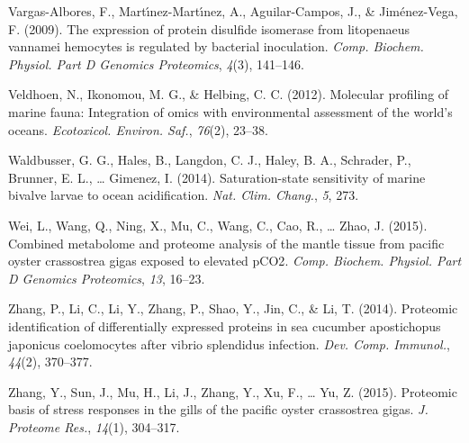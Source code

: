 \documentclass [11pt, proquest] {uwthesis}[2015/03/03]
\newlength{\cslhangindent}
\newenvironment{CSLReferences}%
{\setlength{\parindent}{0pt}%
\everypar{\setlength{\hangindent}{\cslhangindent}}\ignorespaces}%
{\par}
\begin{document}
\begin{CSLReferences}{1}{0}
\leavevmode\hypertarget{ref-Vargas-Albores2009}{}%
Vargas-Albores, F., Martı́nez-Martı́nez, A., Aguilar-Campos, J., \& Jiménez-Vega, F. (2009). The expression of protein disulfide isomerase from litopenaeus vannamei hemocytes is regulated by bacterial inoculation. \emph{Comp. Biochem. Physiol. Part D Genomics Proteomics}, \emph{4}(3), 141--146.

\leavevmode\hypertarget{ref-Veldhoen2012}{}%
Veldhoen, N., Ikonomou, M. G., \& Helbing, C. C. (2012). Molecular profiling of marine fauna: Integration of omics with environmental assessment of the world's oceans. \emph{Ecotoxicol. Environ. Saf.}, \emph{76}(2), 23--38.

\leavevmode\hypertarget{ref-Waldbusser2014}{}%
Waldbusser, G. G., Hales, B., Langdon, C. J., Haley, B. A., Schrader, P., Brunner, E. L., \ldots{} Gimenez, I. (2014). Saturation-state sensitivity of marine bivalve larvae to ocean acidification. \emph{Nat. Clim. Chang.}, \emph{5}, 273.

\leavevmode\hypertarget{ref-Wei2015}{}%
Wei, L., Wang, Q., Ning, X., Mu, C., Wang, C., Cao, R., \ldots{} Zhao, J. (2015). Combined metabolome and proteome analysis of the mantle tissue from pacific oyster crassostrea gigas exposed to elevated {pCO2}. \emph{Comp. Biochem. Physiol. Part D Genomics Proteomics}, \emph{13}, 16--23.

\leavevmode\hypertarget{ref-Zhang2014}{}%
Zhang, P., Li, C., Li, Y., Zhang, P., Shao, Y., Jin, C., \& Li, T. (2014). Proteomic identification of differentially expressed proteins in sea cucumber apostichopus japonicus coelomocytes after vibrio splendidus infection. \emph{Dev. Comp. Immunol.}, \emph{44}(2), 370--377.

\leavevmode\hypertarget{ref-Zhang2015}{}%
Zhang, Y., Sun, J., Mu, H., Li, J., Zhang, Y., Xu, F., \ldots{} Yu, Z. (2015). Proteomic basis of stress responses in the gills of the pacific oyster crassostrea gigas. \emph{J. Proteome Res.}, \emph{14}(1), 304--317.

\end{CSLReferences}
\end{document}

